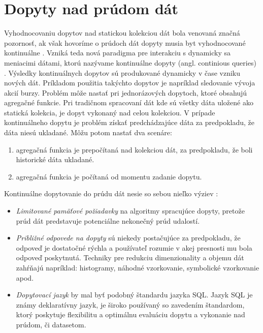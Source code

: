 \section{Dopyty nad prúdom dát}
Vyhodnocovaniu dopytov nad statickou kolekciou dát bola venovaná značná pozornosť, ak však hovoríme o prúdoch dát dopyty musia byt vyhodnocované kontinuálne \citep{babu2001continuous, babcock2002models}. Vzniká teda nová paradigma pre interakciu s dynamicky sa meniacimi dátami, ktorú nazývame kontinuálne dopyty (angl. continious queries) \citep{babu2001continuous}. Výsledky kontinuálnych dopytov sú produkované dynamicky v čase vzniku nových dát. Príkladom použitia takýchto dopytov je napríklad sledovanie vývoja akcií burzy. Problém môže nastať pri jednorázových dopytoch, ktoré obsahujú agregačné funkcie. Pri tradičnom spracovaní dát kde sú všetky dáta uložené ako statická kolekcia, je dopyt vykonaný nad celou kolekciou. V prípade kontinuálneho dopytu je problém získať predchádzajúce dáta za predpokladu, že dáta niesú ukladané. Môžu potom nastať dva scenáre:
\begin{enumerate}
	\item agregačná funkcia je prepočítaná nad kolekciou dát, za predpokladu, že boli historické dáta ukladané.
	\item agregačná funkcia je počítaná od momentu zadanie dopytu.
\end{enumerate}
Kontinuálne dopytovanie do prúdu dát nesie so sebou nieľko výziev \citep{babcock2002models}:
\begin{itemize}
	\item \textit{Limitované pamäťové požiadavky} na algoritmy spracujúce dopyty, pretože prúd dát predstavuje potenciálne nekonečný prúd udalostí.
	\item \textit{Približné odpovede na dopyty} sú niekedy postačujúce za predpokladu, že odpoveď je dostatočné rýchla a používateľ rozumie v akej presnosti mu bola odpoveď poskytnutá. Techniky pre redukciu dimenzionality a objemu dát zahŕňajú napríklad: histogramy, náhodné vzorkovanie, symbolické vzorkovanie apod.
	\item \textit{Dopytovací jazyk} by mal byť podobný štandardu jazyka SQL. Jazyk SQL je známy deklaratívny jazyk, je široko používaný so zavedením štandardom, ktorý poskytuje flexibilitu a optimálnu evaluáciu dopytu a vykonanie nad prúdom, či datasetom. 
\end{itemize}
